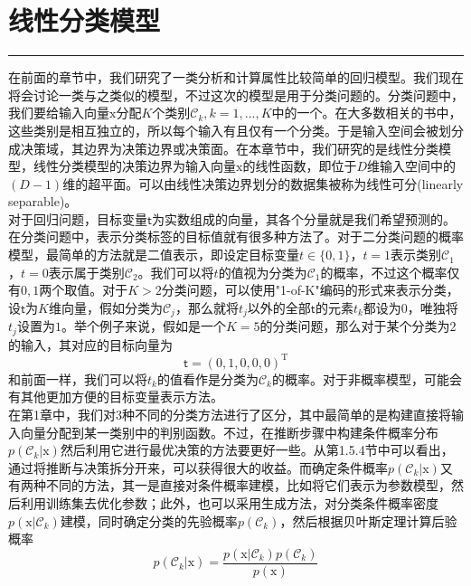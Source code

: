 \documentclass[b5paper]{book}
\renewcommand {\thetable} {\thechapter{}.\arabic{table}}
\renewcommand {\thefigure} {\thechapter{}.\arabic{figure}}
\numberwithin{equation}{chapter}
\newcommand {\bx} {\boldsymbol{\mathrm{x}}}
\newcommand {\sft} {\boldsymbol{\mathsf{t}}}
\newcommand {\rmT} {\mathrm{T}}
\begin{document}
	\chapter{线性分类模型}
	\noindent\rule[0.25\baselineskip]{\textwidth}{1pt}
	\renewcommand {\thetable} {\thechapter{}.\arabic{table}}
	\renewcommand {\thefigure} {\thechapter{}.\arabic{figure}}
	\textnormal{
	\indent 在前面的章节中，我们研究了一类分析和计算属性比较简单的回归模型。我们现在将会讨论一类与之类似的模型，不过这次的模型是用于分类问题的。分类问题中，我们要给输入向量$\bx$分配$K$个类别$\mathcal{C}_k, k=1,...,K$中的一个。在大多数相关的书中，这些类别是相互独立的，所以每个输入有且仅有一个分类。于是输入空间会被划分成决策域，其边界为决策边界或决策面。在本章节中，我们研究的是线性分类模型，线性分类模型的决策边界为输入向量$\bx$的线性函数，即位于$D$维输入空间中的$(D-1)$维的超平面。可以由线性决策边界划分的数据集被称为线性可分(linearly separable)。\\
	\indent 对于回归问题，目标变量$\sft$为实数组成的向量，其各个分量就是我们希望预测的。在分类问题中，表示分类标签的目标值就有很多种方法了。对于二分类问题的概率模型，最简单的方法就是二值表示，即设定目标变量$t \in \{0,1\}$，$t=1$表示类别$\mathcal{C}_1$，$t=0$表示属于类别$\mathcal{C}_2$。我们可以将$t$的值视为分类为$\mathcal{C}_1$的概率，不过这个概率仅有$0,1$两个取值。对于$K>2$分类问题，可以使用"1-of-K"编码的形式来表示分类，设$\sft$为$K$维向量，假如分类为$\mathcal{C}_j$，那么就将$t_j$以外的全部$\sft$的元素$t_k$都设为$0$，唯独将$t_j$设置为$1$。举个例子来说，假如是一个$K=5$的分类问题，那么对于某个分类为$2$的输入，其对应的目标向量为
	\begin{equation}
		\sft = (0,1,0,0,0)^{\rmT}
	\end{equation}
	和前面一样，我们可以将$t_k$的值看作是分类为$\mathcal{C}_k$的概率。对于非概率模型，可能会有其他更加方便的目标变量表示方法。\\
	\indent 在第1章中，我们对3种不同的分类方法进行了区分，其中最简单的是构建直接将输入向量分配到某一类别中的判别函数。不过，在推断步骤中构建条件概率分布$p(\mathcal{C}_k|\bx)$然后利用它进行最优决策的方法要更好一些。从第1.5.4节中可以看出，通过将推断与决策拆分开来，可以获得很大的收益。而确定条件概率$p(\mathcal{C}_k|\bx)$又有两种不同的方法，其一是直接对条件概率建模，比如将它们表示为参数模型，然后利用训练集去优化参数；此外，也可以采用生成方法，对分类条件概率密度$p(\bx|\mathcal{C}_k)$建模，同时确定分类的先验概率$p(\mathcal{C}_k)$，然后根据贝叶斯定理计算后验概率
	\begin{equation}
		p(\mathcal{C}_k|\bx) = \frac{p(\bx|\mathcal{C}_k)p(\mathcal{C}_k)}{p(\bx)}
	\end{equation}
}
\end{document}
